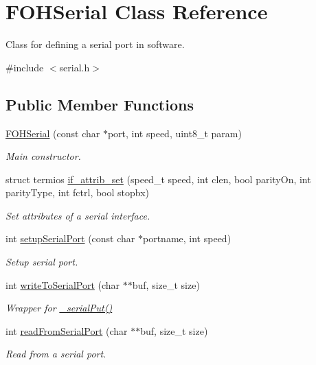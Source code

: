 \hypertarget{classFOHSerial}{}\section{F\+O\+H\+Serial Class Reference}
\label{classFOHSerial}


Class for defining a serial port in software.  




{\ttfamily \#include $<$serial.\+h$>$}

\subsection*{Public Member Functions}
\begin{DoxyCompactItemize}
\item 
\mbox{\hyperlink{classFOHSerial_a9d043cc8235a679af5c1dc68595fba02}{F\+O\+H\+Serial}} (const char $\ast$port, int speed, uint8\+\_\+t param)
\begin{DoxyCompactList}\small\item\em Main constructor. \end{DoxyCompactList}\item 
struct termios \mbox{\hyperlink{classFOHSerial_a06fd114b3c22d3959ee9454475f2c6f8}{if\+\_\+attrib\+\_\+set}} (speed\+\_\+t speed, int clen, bool parity\+On, int parity\+Type, int fctrl, bool stopbx)
\begin{DoxyCompactList}\small\item\em Set attributes of a serial interface. \end{DoxyCompactList}\item 
int \mbox{\hyperlink{classFOHSerial_ad76591cc93c0abea4acdbc3ebb47435b}{setup\+Serial\+Port}} (const char $\ast$portname, int speed)
\begin{DoxyCompactList}\small\item\em Setup serial port. \end{DoxyCompactList}\item 
int \mbox{\hyperlink{classFOHSerial_a6bb54e84682142525b9a24a122157234}{write\+To\+Serial\+Port}} (char $\ast$$\ast$buf, size\+\_\+t size)
\begin{DoxyCompactList}\small\item\em Wrapper for \mbox{\hyperlink{classFOHSerial_add9b2e556b56459b2eddc9b71f5c80ed}{\+\_\+serial\+Put()}} \end{DoxyCompactList}\item 
int \mbox{\hyperlink{classFOHSerial_a569186c2a1975065f16c473f79f804c4}{read\+From\+Serial\+Port}} (char $\ast$$\ast$buf, size\+\_\+t size)
\begin{DoxyCompactList}\small\item\em Read from a serial port. \end{DoxyCompactList}\end{DoxyCompactItemize}

